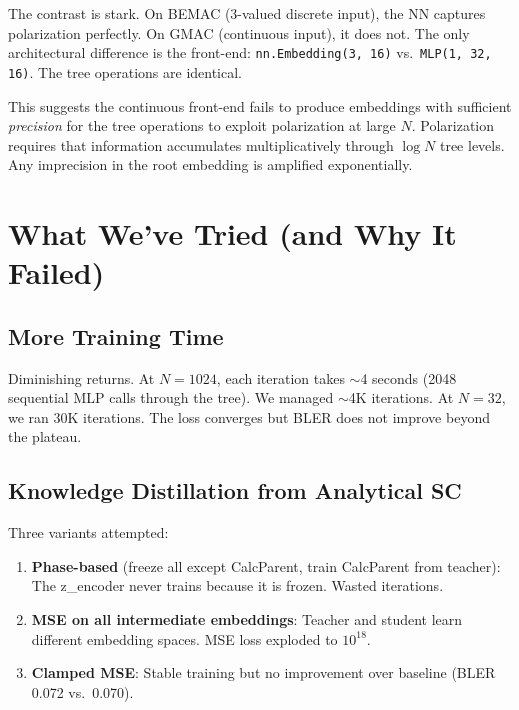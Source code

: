 \documentclass[10pt]{article}
\begin{document}
The contrast is stark. On BEMAC (3-valued discrete input), the NN captures polarization perfectly. On GMAC (continuous input), it does not. The only architectural difference is the front-end: \texttt{nn.Embedding(3, 16)} vs.\ \texttt{MLP(1, 32, 16)}. The tree operations are identical.

This suggests the continuous front-end fails to produce embeddings with sufficient \emph{precision} for the tree operations to exploit polarization at large $N$. Polarization requires that information accumulates multiplicatively through $\log N$ tree levels. Any imprecision in the root embedding is amplified exponentially.

\section{What We've Tried (and Why It Failed)}

\subsection{More Training Time}

Diminishing returns. At $N = 1024$, each iteration takes $\sim$4 seconds (2048 sequential MLP calls through the tree). We managed $\sim$4K iterations. At $N = 32$, we ran 30K iterations. The loss converges but BLER does not improve beyond the plateau.

\subsection{Knowledge Distillation from Analytical SC}

Three variants attempted:

\begin{enumerate}[nosep]
    \item \textbf{Phase-based} (freeze all except CalcParent, train CalcParent from teacher): The z\_encoder never trains because it is frozen. Wasted iterations.
    \item \textbf{MSE on all intermediate embeddings}: Teacher and student learn different embedding spaces. MSE loss exploded to $10^{18}$.
    \item \textbf{Clamped MSE}: Stable training but no improvement over baseline (BLER 0.072 vs.\ 0.070).
\end{enumerate}
\end{document}
